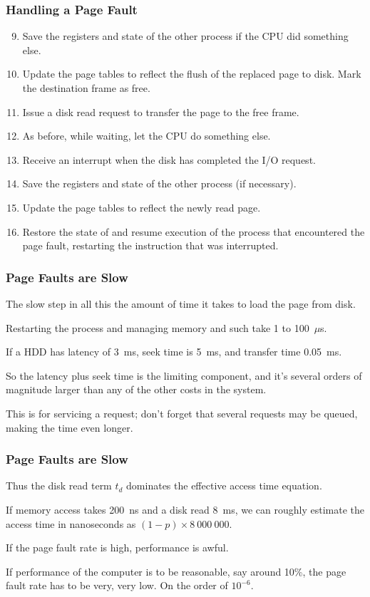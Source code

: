 \begin{frame}
\frametitle{Handling a Page Fault}

\begin{enumerate}
	\setcounter{enumi}{8}
	\item Save the registers and state of the other process if the CPU did something else.
	\item Update the page tables to reflect the flush of the replaced page to disk. Mark the destination frame as free.
	\item Issue a disk read request to transfer the page to the free frame.
	\item As before, while waiting, let the CPU do something else.
	\item Receive an interrupt when the disk has completed the I/O request.
	\item Save the registers and state of the other process (if necessary).
	\item Update the page tables to reflect the newly read page.
	\item Restore the state of and resume execution of the process that encountered the page fault, restarting the instruction that was interrupted.
\end{enumerate}


\end{frame}

\begin{frame}
\frametitle{Page Faults are Slow}

The slow step in all this the amount of time it takes to load the page from disk. 

Restarting the process and managing memory and such take 1 to 100~$\mu$s.

If a HDD has latency of 3~ms, seek time is 5~ms, and transfer time 0.05~ms. 

So the latency plus seek time is the limiting component, and it's several orders of magnitude larger than any of the other costs in the system. 

This is for servicing a request; don't forget that several requests may be queued, making the time even longer.

\end{frame}

\begin{frame}
\frametitle{Page Faults are Slow}

Thus the disk read term $t_{d}$ dominates the effective access time equation. 

If memory access takes 200~ns and a disk read 8~ms, we can roughly estimate the access time in nanoseconds as $(1-p) \times 8~000~000$. 

If the page fault rate is high, performance is awful. 

If performance of the computer is to be reasonable, say around 10\%, the page fault rate has to be very, very low. On the order of $10^{-6}$. 

\end{frame}

